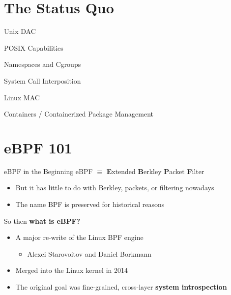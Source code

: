 \documentclass[12pt, dvipsnames, aspectratio=169]{beamer}
\begin{document}
\section{The Status Quo}

\begin{frame}[c]{Unix DAC}

\end{frame}

\begin{frame}[c]{POSIX Capabilities}

\end{frame}

\begin{frame}[c]{Namespaces and Cgroups}

\end{frame}

\begin{frame}[c]{System Call Interposition}

\end{frame}

\begin{frame}[c]{Linux MAC}

\end{frame}

\begin{frame}[c]{Containers / Containerized Package Management}

\end{frame}

\section{eBPF 101}

\begin{frame}[c]{eBPF in the Beginning}
eBPF $\equiv$ \textbf{E}xtended \textbf{B}erkley \textbf{P}acket \textbf{F}ilter
\begin{itemize}
    \item But it has little to do with Berkley, packets, or filtering nowadays
    \item The name BPF is preserved for historical reasons
\end{itemize}
\vfill
So then \textbf{what is eBPF?}
\begin{itemize}
    \item A major re-write of the Linux BPF engine
    \begin{itemize}
        \item Alexei Starovoitov and Daniel Borkmann
    \end{itemize}
    \item Merged into the Linux kernel in 2014
    \item The original goal was fine-grained, cross-layer \textbf{system introspection}
\end{itemize}
\end{frame}
\end{document}
